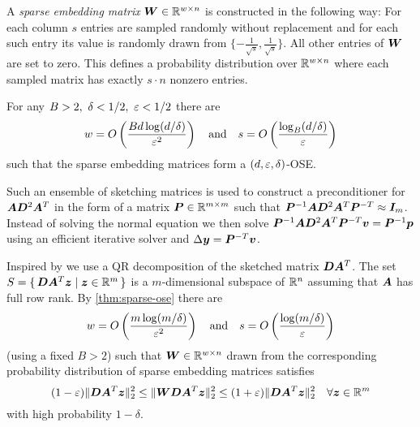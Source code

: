 \begin{definition}
A \emph{sparse embedding matrix} \(\bm{W} \in \mathbb{R}^{w \times n}\) is constructed in the following way:
For each column \(s\) entries are sampled randomly without replacement and for each such entry its value is randomly drawn from \(\{ - \frac{1}{\sqrt{s}}, \frac{1}{\sqrt{s}} \}\).
All other entries of \(\bm{W}\) are set to zero.
This defines a probability distribution over \(\mathbb{R}^{w \times n}\) where each sampled matrix has exactly \(s \cdot n\) nonzero entries.
\end{definition}

\begin{theorem}  \label{thm:sparse-ose}
For any \(B > 2, \ \delta < 1/2, \ \varepsilon < 1/2\) there are
\[ w = O \left( \frac{B d \log(d/\delta)}{\varepsilon^2} \right) \quad \text{and} \quad s = O \left( \frac{\log_B(d/\delta)}{\varepsilon} \right)\]
such that the sparse embedding matrices form a \((d, \varepsilon, \delta)\)-OSE.
\end{theorem}

Such an ensemble of sketching matrices is used to construct a preconditioner for \(\bm{A} \bm{D}^2 \bm{A}^T\) in the form of a matrix \(\bm{P} \in \mathbb{R}^{m \times m}\) such that
\( \bm{P}^{-1} \bm{A} \bm{D}^2 \bm{A}^T \bm{P}^{-T} \approx \bm{I}_m \).
Instead of solving the normal equation we then solve
\( \bm{P}^{-1} \bm{A} \bm{D}^2 \bm{A}^T \bm{P}^{-T} \bm{v} = \bm{P}^{-1} \bm{p} \)
using an efficient iterative solver and \(\Delta\bm{y} = \bm{P}^{-T} \bm{v}\).

Inspired by \textcite{Avron-FasterRandomizedInfeasibleIPMs} we use a QR decomposition of the sketched matrix \(\bm{D}\bm{A}^T\).
The set \(S = \set{ \bm{D}\bm{A}^T \bm{z} | \bm{z} \in \mathbb{R}^m}\) is a \(m\)-dimensional subspace of \(\mathbb{R}^n\) assuming that \(\bm{A}\) has full row rank.
By \cref{thm:sparse-ose} there are
\[ w = O \left(  \frac{m \log(m/\delta)}{\varepsilon^2}  \right) \quad \text{and} \quad s = O \left(  \frac{\log(m/\delta)}{\varepsilon}  \right)\]
(using a fixed \(B > 2\)) such that \(\bm{W} \in \mathbb{R}^{w \times n}\) drawn from the corresponding probability distribution of sparse embedding matrices satisfies
\begin{equation}
  (1-\varepsilon) \lVert \bm{D}\bm{A}^T \bm{z} \rVert_2^2 \leq \lVert \bm{W}\bm{D}\bm{A}^T \bm{z} \rVert_2^2 \leq (1+\varepsilon)\lVert \bm{D}\bm{A}^T \bm{z} \rVert_2^2 \quad \forall \bm{z} \in \mathbb{R}^m \label{eqn:ose-for-DAT}
\end{equation}
with high probability \(1 - \delta\).

